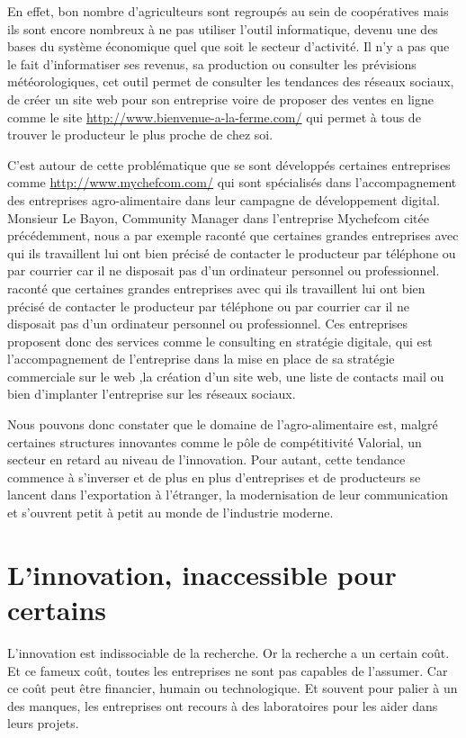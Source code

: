 \documentclass[a4paper,12pt]{report}
\begin{document}
			En effet, bon nombre d’agriculteurs sont regroupés au sein de coopératives mais ils sont encore nombreux à ne pas utiliser l’outil informatique, devenu une des bases du système économique quel que soit le secteur d’activité\cite{FAIPeuInteresses,AdoptionTICAgricole}. Il n’y a pas que le fait d’informatiser ses revenus, sa production ou consulter les prévisions météorologiques, cet outil permet de consulter les tendances des réseaux sociaux, de créer un site web pour son entreprise voire de proposer des ventes en ligne comme le site \url{http://www.bienvenue-a-la-ferme.com/} qui permet à tous de trouver le producteur le plus proche de chez soi.
			
			C’est autour de cette problématique que se sont développés certaines entreprises comme \url{http://www.mychefcom.com/} qui sont spécialisés dans l’accompagnement des entreprises agro-alimentaire dans leur campagne de développement digital. Monsieur Le Bayon, Community Manager dans l’entreprise Mychefcom citée précédemment, nous a par exemple raconté que certaines grandes entreprises avec qui ils travaillent lui ont bien précisé de contacter le producteur par téléphone ou par courrier car il ne disposait pas d’un ordinateur personnel ou professionnel. raconté que certaines grandes entreprises avec qui ils travaillent lui ont bien précisé de contacter le producteur par téléphone ou par courrier car il ne disposait pas d’un ordinateur personnel ou professionnel. Ces entreprises proposent donc des services comme le consulting en stratégie digitale, qui est l’accompagnement de l’entreprise dans la mise en place de sa stratégie commerciale sur le web ,la création d’un site web, une liste de contacts mail ou bien d’implanter l’entreprise sur les réseaux sociaux.
			
			Nous pouvons donc constater que le domaine de l’agro-alimentaire est, malgré certaines structures innovantes comme le pôle de compétitivité Valorial, un secteur en retard au niveau de l’innovation. Pour autant, cette tendance commence à s’inverser et de plus en plus d’entreprises et de producteurs se lancent dans l’exportation à l’étranger, la modernisation de leur communication et s’ouvrent petit à petit au monde de l’industrie moderne.
			
	\section{L'innovation, inaccessible pour certains}
		L’innovation est indissociable de la recherche. Or la recherche a un certain coût. Et ce fameux coût, toutes les entreprises ne sont pas capables de l’assumer. Car ce coût peut être financier, humain ou technologique. Et souvent pour palier à un des manques, les entreprises ont recours à des laboratoires pour les aider dans leurs projets.
		
\end{document}
